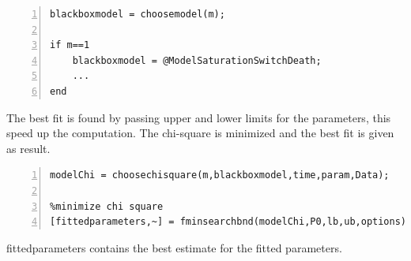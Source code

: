 \documentclass{article}
\begin{document}
\begin{lstlisting}[frame=single,numbers=left,style=Matlab-Pyglike]
%define the model
blackboxmodel = choosemodel(m);

if m==1
    blackboxmodel = @ModelSaturationSwitchDeath;
    ...
end
\end{lstlisting}
The best fit is found by passing upper and lower limits for the parameters, this speed up the computation. The chi-square is minimized and the best fit is given as result.
\begin{lstlisting}[frame=single,numbers=left,style=Matlab-Pyglike]
%model chi square
modelChi = choosechisquare(m,blackboxmodel,time,param,Data);

%minimize chi square
[fittedparameters,~] = fminsearchbnd(modelChi,P0,lb,ub,options);
\end{lstlisting}
fittedparameters contains the best estimate for the fitted parameters.
\end{document}
